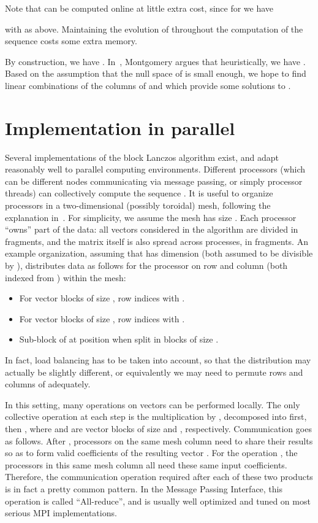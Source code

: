 Note that  can be computed online at little extra cost, since for
 we have

with  as above.
Maintaining the evolution of  throughout the computation of the
sequence costs some extra memory.

By construction, we have .
In~\cite{EC:Montgomery95}, Montgomery argues that heuristically, we have
. Based on the
assumption that the null space of  is small enough, we hope to find
linear combinations of the columns of  and  which
provide some solutions to .


\section{Implementation in parallel}

Several implementations of the block Lanczos algorithm exist, and adapt
reasonably well to parallel computing environments. Different
processors (which can be different nodes communicating via message
passing, or simply processor threads) can collectively compute the
sequence .  It is useful to organize processors in a
two-dimensional (possibly toroidal) mesh, following the explanation in~\cite{Montgomery00}.
For simplicity, we assume the mesh has size .  Each processor
``owns'' part of the data: all vectors considered in the algorithm are
divided in  fragments, and the matrix  itself is also spread
across processes, in  fragments.
An example organization, assuming that  has dimension 
(both assumed to be divisible by ), distributes data as follows for
the processor on row  and column  (both indexed from ) within the mesh:
\begin{itemize}
    \item For vector blocks of size , row indices  with .
    \item For vector blocks of size , row indices  with .
    \item Sub-block of  at position  when split in blocks of
size .
\end{itemize}
In fact, load balancing has to be taken into account, so that the
distribution may actually be slightly different, or equivalently we may
need to permute rows and columns of  adequately.

In this setting, many operations on vectors can be performed locally.  The
only collective operation at each step is the multiplication by ,
decomposed into  first, then , where
 and  are vector blocks of size  and ,
respectively. Communication goes as follows. After ,
processors on the same mesh column need to share their results so as to
form  valid coefficients of the resulting vector . For the
operation , the processors in this same mesh column all
need these same  input coefficients. Therefore, the communication 
operation required after each of these two products is in fact a pretty
common pattern. In the Message Passing Interface, this operation is called
``All-reduce'', and is usually well optimized and tuned on most serious
MPI implementations.

